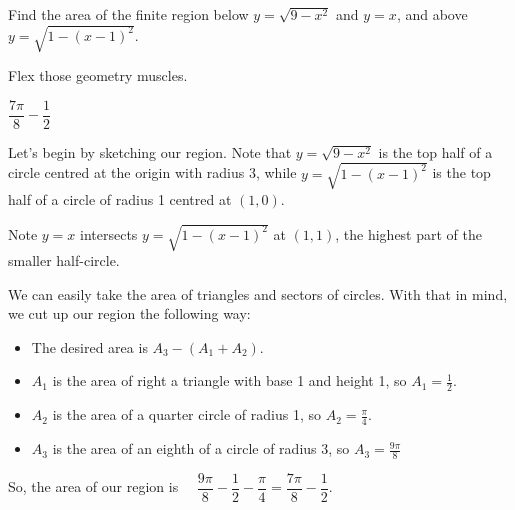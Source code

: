 \begin{question}
Find the area of the finite region below $y=\sqrt{9-x^2}$ and $y=x$, and above  $y=\sqrt{1-(x-1)^2}$.
\end{question}
\begin{hint}
Flex those geometry muscles.
\end{hint}
\begin{answer}
$\dfrac{7\pi}{8}-\dfrac{1}{2}$
\end{answer}
\begin{solution}
Let's begin by sketching our region. Note that $y=\sqrt{9-x^2}$ is the top half of a circle centred at the origin with radius 3, while $y=\sqrt{1-(x-1)^2}$ is the top half of a circle of radius 1 centred at $(1,0)$.
\begin{center}
\end{center}

Note $y=x$ intersects $y=\sqrt{1-(x-1)^2}$ at $(1,1)$, the highest part of the smaller half-circle.

We can easily take the area of  triangles and sectors of circles. With that in mind, we cut up our region the following way:

\begin{center}
\end{center}
\begin{itemize}
\item The desired area is $A_3-(A_1+A_2)$.
\item $A_1$ is the area of right a triangle with base 1 and height 1, so $A_1 = \frac{1}{2}$.
\item $A_2$ is the area of a quarter circle of radius 1, so $A_2=\frac{\pi}{4}$.
\item $A_3$ is the area of an eighth of a circle of radius 3, so $A_3 = \frac{9\pi}{8}$
\end{itemize}
So, the area of our region is~~ $\dfrac{9\pi}{8} - \dfrac{1}{2}-\dfrac{\pi}{4}=\dfrac{7\pi}{8}-\dfrac{1}{2}$.
\end{solution}

